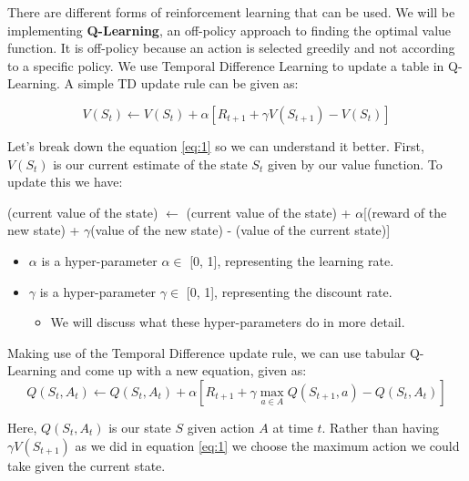 \documentclass[]{final_report}
\begin{document}
There are different forms of reinforcement learning that can be used. We will be implementing \textbf{Q-Learning}, an off-policy approach to finding the optimal value function. It is off-policy because an action is selected greedily and not according to a specific policy. We use Temporal Difference Learning to update a table in Q-Learning. A simple TD update rule can be given as:

\begin{equation}\label{eq:1}
    V(S_t) \xleftarrow{} V(S_t) + \alpha[R_{t+1} + \gamma V(S_{t+1}) - V(S_t)]
\end{equation}

Let's break down the equation \ref{eq:1} so we can understand it better. First, $V(S_t)$ is our current estimate of the state $S_t$ given by our value function. To update this we have:
\begin{center}
    (current value of the state)  $\xleftarrow{}$ (current value of the state) + $\alpha$[(reward of the new state) + $\gamma$(value of the new state) - (value of the current state)]
\end{center}
\begin{itemize}
    \item $\alpha$ is a hyper-parameter $\alpha \in$ [0, 1], representing the learning rate.
    \item $\gamma$ is a hyper-parameter $\gamma \in$ [0, 1], representing the discount rate.
    \begin{itemize}
        \item We will discuss what these hyper-parameters do in more detail.
    \end{itemize}
\end{itemize}

Making use of the Temporal Difference update rule, we can use tabular Q-Learning and come up with a new equation, given as:
\begin{equation}\label{eq:2}
    Q(S_t, A_t) \xleftarrow{} Q(S_t, A_t) + \alpha[R_{t+1} + \gamma \max_{a \in A} Q(S_{t+1}, a) - Q(S_t, A_t)
    ]
\end{equation}

Here, $Q(S_t, A_t)$ is our state $S$ given action $A$ at time $t$. Rather than having  $\gamma V(S_{t+1})$ as we did in equation \ref{eq:1} we choose the maximum action we could take given the current state.
\end{document}
